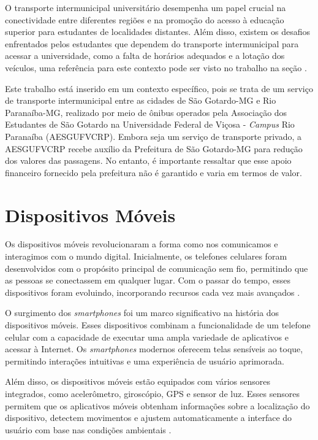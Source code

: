 \documentclass[
    12pt,                   %
    openright,              %
    oneside,                %
    a4paper,                %
    sumario=tradicional,    %
    english,                %
    brazil,                 %
    ]{abntex2}
\begin{document}
    O transporte intermunicipal universitário desempenha um papel crucial na conectividade entre diferentes regiões e na promoção do acesso à educação superior para estudantes de localidades distantes. Além disso, existem os desafios enfrentados pelos estudantes que dependem do transporte intermunicipal para acessar a universidade, como a falta de horários adequados e a lotação dos veículos, uma referência para este contexto pode ser visto no trabalho na seção \cite{Souza2016}.
    
    Este trabalho está inserido em um contexto específico, pois se trata de um serviço de transporte intermunicipal entre as cidades de São Gotardo-MG e Rio Paranaíba-MG, realizado por meio de ônibus operados pela Associação dos Estudantes de São Gotardo na Universidade Federal de Viçosa - \textit{Campus} Rio Paranaíba (AESGUFVCRP). Embora seja um serviço de transporte privado, a AESGUFVCRP recebe auxílio da Prefeitura de São Gotardo-MG para redução dos valores das passagens. No entanto, é importante ressaltar que esse apoio financeiro fornecido pela prefeitura não é garantido e varia em termos de valor.

\section{Dispositivos Móveis}
\label{sec:dispositivos-moveis}

Os dispositivos móveis revolucionaram a forma como nos comunicamos e interagimos com o mundo digital. Inicialmente, os telefones celulares foram desenvolvidos com o propósito principal de comunicação sem fio, permitindo que as pessoas se conectassem em qualquer lugar. Com o passar do tempo, esses dispositivos foram evoluindo, incorporando recursos cada vez mais avançados \cite{adrenaline-evolucao-celulares}.

O surgimento dos \textit{smartphones} foi um marco significativo na história dos dispositivos móveis. Esses dispositivos combinam a funcionalidade de um telefone celular com a capacidade de executar uma ampla variedade de aplicativos e acessar à Internet. Os \textit{smartphones} modernos oferecem telas sensíveis ao toque, permitindo interações intuitivas e uma experiência de usuário aprimorada\cite{adrenaline-evolucao-celulares}.

Além disso, os dispositivos móveis estão equipados com vários sensores integrados, como acelerômetro, giroscópio, GPS e sensor de luz. Esses sensores permitem que os aplicativos móveis obtenham informações sobre a localização do dispositivo, detectem movimentos e ajustem automaticamente a interface do usuário com base nas condições ambientais \cite{techtudo-smartphone}.
\end{document}
